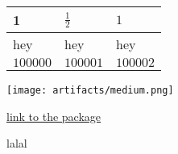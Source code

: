 \documentclass[12pt]{article}
\begin{document}
\begin{table}[]
\begin{tabular}{|l|l|l|}
\hline 
1 & $\frac 1 2$ & $1$\\ \hline 
hey & hey & hey\\ \hline 
$100000$ & $100001$ & $100002$\\ \hline 
\end{tabular}
\end{table}
\texttt{[image: artifacts/medium.png]}

\href{https://anaconda.org/NeKpoT/codetreegen}{\underline{link to the package}}

lalal
\end{document}
